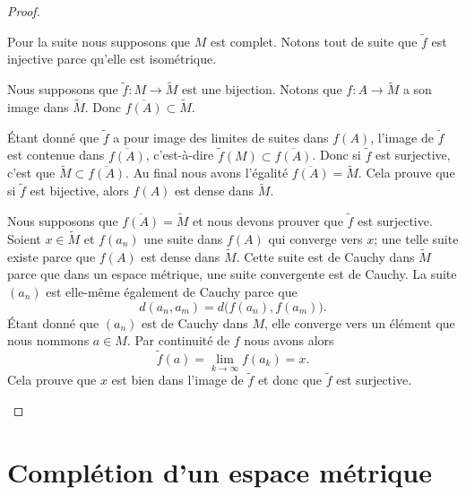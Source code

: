 \begin{proof}
\begin{subproof}
		Pour la suite nous supposons que \( M\) est complet. Notons tout de suite que \( \tilde f\) est injective parce qu'elle est isométrique.


		Nous supposons que \( \tilde f\colon M\to \tilde M\) est une bijection. Notons que \(f \colon A\to \tilde M \) a son image dans \( \tilde M\). Donc \( \overline{f(A)}\subset \tilde M\).

		Étant donné que \( \tilde f\) a pour image des limites de suites dans \( f(A)\), l'image de \( \tilde f\) est contenue dans \( \overline{ f(A) }\), c'est-à-dire \( \tilde f(M)\subset\overline{f(A)} \). Donc si \( \tilde f\) est surjective, c'est que \( \tilde M\subset \overline{ f(A) }\). Au final nous avons l'égalité \( \overline{ f(A) }=\tilde M\). Cela prouve que si \( \tilde f\) est bijective, alors \( f(A)\) est dense dans \( \tilde M\).



		Nous supposons que \( \overline{ f(A) }=\tilde M\) et nous devons prouver que \( \tilde f\) est surjective. Soient \( x\in \tilde M\) et \( f(a_n)\) une suite dans \( f(A)\) qui converge vers \( x\); une telle suite existe parce que \( f(A)\) est dense dans \( \tilde M\). Cette suite est de Cauchy dans \( \tilde M\) parce que dans un espace métrique, une suite convergente est de Cauchy. La suite \( (a_n)\) est elle-même également de Cauchy parce que
		\begin{equation}
			d(a_n,a_m)=d\big( f(a_n),f(a_m) \big).
		\end{equation}
		Étant donné que \( (a_n)\) est de Cauchy dans \( M\), elle converge vers un élément que nous nommons \( a\in M\). Par continuité de \( f \) nous avons alors
		\begin{equation}
			\tilde f(a)=\lim_{k\to \infty} f(a_k)=x.
		\end{equation}
		Cela prouve que \( x\) est bien dans l'image de \( \tilde f\) et donc que \( \tilde f\) est surjective.
	\end{subproof}
\end{proof}

\section{Complétion d'un espace métrique}


